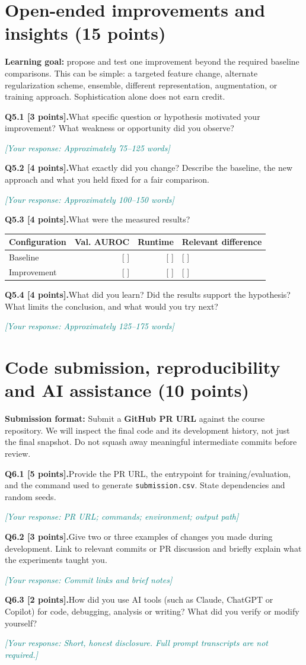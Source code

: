 \documentclass[11pt,letterpaper]{article}
\newcommand{\placeholder}[1]{\par\noindent\textcolor{teal}{\textit{[Your response: #1]}}\par\vspace{0.3em}}
\newcommand{\question}[2]{\needspace{4\baselineskip}\par\addvspace{0.45em}\noindent\textbf{#1}\quad #2\par\nobreak\vspace{0.1em}}
\begin{document}
\section{Open-ended improvements and insights (15 points)}
\textbf{Learning goal:} propose and test one improvement beyond the required baseline comparisons. This can be simple: a targeted feature change, alternate regularization scheme, ensemble, different representation, augmentation, or training approach. Sophistication alone does not earn credit.

\question{Q5.1 [3 points].}{What specific question or hypothesis motivated your improvement? What weakness or opportunity did you observe?}
\placeholder{Approximately 75--125 words}
\question{Q5.2 [4 points].}{What exactly did you change? Describe the baseline, the new approach and what you held fixed for a fair comparison.}
\placeholder{Approximately 100--150 words}
\question{Q5.3 [4 points].}{What were the measured results?}
\begin{tabularx}{\linewidth}{@{}YrrY@{}}\toprule Configuration & Val. AUROC & Runtime & Relevant difference \\ \midrule Baseline & [ ] & [ ] & [ ] \\ Improvement & [ ] & [ ] & [ ] \\ \bottomrule\end{tabularx}
\question{Q5.4 [4 points].}{What did you learn? Did the results support the hypothesis? What limits the conclusion, and what would you try next?}
\placeholder{Approximately 125--175 words}

\section{Code submission, reproducibility and AI assistance (10 points)}
\textbf{Submission format:} Submit a \textbf{GitHub PR URL} against the course repository. We will inspect the final code and its development history, not just the final snapshot. Do not squash away meaningful intermediate commits before review.

\question{Q6.1 [5 points].}{Provide the PR URL, the entrypoint for training/evaluation, and the command used to generate \texttt{submission.csv}. State dependencies and random seeds.}
\placeholder{PR URL; commands; environment; output path}
\question{Q6.2 [3 points].}{Give two or three examples of changes you made during development. Link to relevant commits or PR discussion and briefly explain what the experiments taught you.}
\placeholder{Commit links and brief notes}
\question{Q6.3 [2 points].}{How did you use AI tools (such as Claude, ChatGPT or Copilot) for code, debugging, analysis or writing? What did you verify or modify yourself?}
\placeholder{Short, honest disclosure. Full prompt transcripts are not required.}
\end{document}
